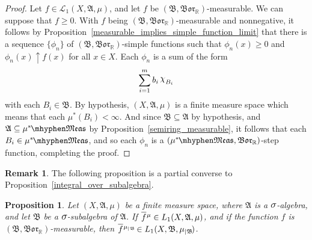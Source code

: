 \documentclass[
twoside=true,
paper=letter,
fontsize=9pt,
pagesize=auto,
leqno,
openany,
headsepline,
overfullrule,
]{scrbook}
\theoremstyle{plain}
\theoremstyle{plain}
\newtheorem{prop}[thm]{Proposition}
\theoremstyle{definition}
\newtheorem{rmk}[thm]{Remark}
\theoremstyle{bfnoteitalic}
\theoremstyle{bfnoteroman}
\newcommand{\sigalg}[1]{\mathfrak{#1}}
\newcommand{\cali}[1]{\mathscr{#1}}
\newcommand{\borel}{\mathfrak{Bor}}
\newcommand{\textsigma}{\hbox{\large{$\sigma$}}\kern-1pt}
\newcommand{\charfunction}[1]{\mathop{{\raisebox{2pt}{$\chi$}}_{#1}}}
\newcommand{\restrictedto}[1]{_{\lvert#1}\kern-1.5pt}
\newcommand{\R}{\mathbb{R}}
\newcommand{\sigmaalgebra}{\sigalg{A}}
\newcommand{\sigmaalgebraii}{\sigalg{B}}
\newcommand{\measurable}[1]{{#1}\mhyphen\mathfrak{Meas}}
\newcommand{\kernast}{\ast\kern-1pt}
\newcommand{\funcf}{f}
\newcommand{\measurespace}{X}
\newcommand{\measure}{\mu}
\newcommand{\measmu}{\mu}
\newcommand{\setii}{B}
\newcommand*\xbar[1]{%
   \hbox{%
     \vbox{%
       \hrule height 0.4pt %
       \kern0.4ex%
       \hbox{%
         \ensuremath{#1}%
       }%
     }%
   }%
}
\newcommand{\lebclass}[1]{\hspace{.5pt}\xbar{#1}\hspace{0.5pt}}
\newcommand{\ellclass}[2]{\lebclass{#1}^{#2}}
\begin{document}
\begin{proof}
Let $f\in\cali{L}_1(\measurespace, \sigmaalgebra, \measure)$, and let $f$ be
$(\sigmaalgebraii, \borel_\R)$\hyp{}measurable. We can suppose that $f\geq 0$.
With $\funcf$ being $(\sigmaalgebraii, \borel_\R)$\hyp{}measurable and nonnegative, it follows by Proposition~\ref{measurable_implies_simple_function_limit}
that there is a sequence $\{\phi_n\}$ of $(\sigmaalgebraii, \borel_\R)$\hyp{}simple functions such that
$\phi_n(x)\geq 0$ and $\phi_n(x)\uparrow f(x)$ for all $x\in\measurespace$.
Each
$\phi_n$ is a sum of the form
\[
\sum_{i=1}^m b_i \charfunction{\setii_i}
\]
with each $\setii_i \in \sigmaalgebraii$.
By hypothesis,  $(\measurespace, \sigmaalgebra, \measmu)$
is a finite measure space which means that each
$\measmu^*(\setii_i)<\infty$.
And since $\sigmaalgebraii\subseteq\sigmaalgebra$ by hypothesis, and
$\sigmaalgebra \subseteq \measurable{\measmu^\kernast}$ by
Proposition~\ref{semiring_measurable}, it follows that each
$\setii_i \in\measurable{\measmu^\kernast}$, and so each $\phi_n$ is a
$(\measurable{\measmu^\kernast}, \borel_\R)$\hyp{}step function,
completing the proof.
\end{proof}



\begin{rmk}
The following proposition is a partial converse to Proposition~\ref{integral_over_subalgebra}.
\end{rmk}


\begin{prop}\label{algebra_to_subalgebra}
Let $(\measurespace, \sigmaalgebra, \measure)$ be a finite measure space, where $\sigmaalgebra$ is a $\textsigma$-algebra, and let $\sigmaalgebraii$ be a $\textsigma$-subalgebra of $\sigmaalgebra$. 
If $\ellclass{f}{\measure} 
\in L_1(\measurespace, \sigmaalgebra, \measure)$, and if the function $f$ is $(\sigmaalgebraii, \borel_\R)$\hyp{}measurable, then
$\ellclass{f}{\measure\restrictedto{\sigmaalgebraii}}
\in L_1(\measurespace, \sigmaalgebraii, \measure\restrictedto{\sigmaalgebraii})$.
\end{prop}
\end{document}
